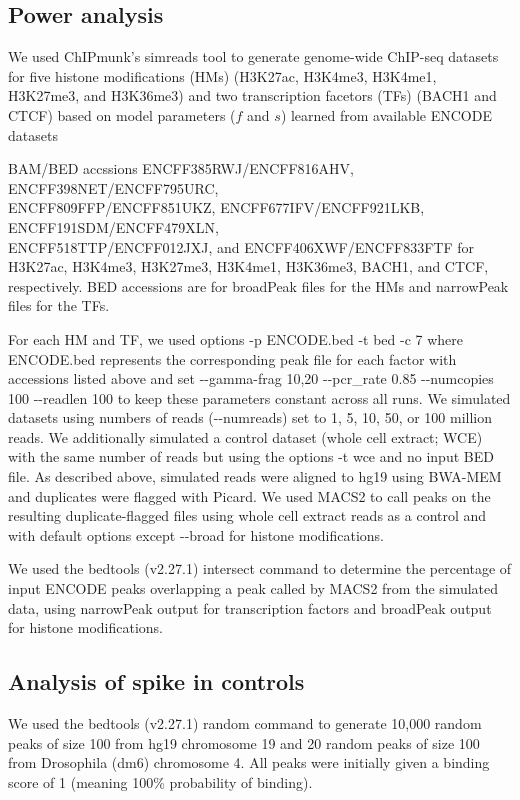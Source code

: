 \documentclass[12pt]{article}
\begin{document}
\subsection*{Power analysis}
We used ChIPmunk's simreads tool to generate genome-wide ChIP-seq datasets for five histone modifications (HMs) (H3K27ac, H3K4me3, H3K4me1, H3K27me3, and H3K36me3) and two transcription facetors (TFs) (BACH1 and CTCF) based on model parameters ($f$ and $s$) learned from available ENCODE datasets

BAM/BED accssions ENCFF385RWJ/ENCFF816AHV, ENCFF398NET/ENCFF795URC, \\ENCFF809FFP/ENCFF851UKZ, ENCFF677IFV/ENCFF921LKB, ENCFF191SDM/ENCFF479XLN,\\ ENCFF518TTP/ENCFF012JXJ, and ENCFF406XWF/ENCFF833FTF for
H3K27ac, H3K4me3, H3K27me3, H3K4me1, H3K36me3, BACH1, and CTCF, respectively. BED accessions are for broadPeak files for the HMs and narrowPeak files for the TFs.

For each HM and TF, we used options -p ENCODE.bed -t bed -c 7 where ENCODE.bed represents the corresponding peak file for each factor with accessions listed above and set -{}-gamma-frag 10,20 -{}-pcr\_rate 0.85 -{}-numcopies 100 -{}-readlen 100 to keep these parameters constant across all runs.
We simulated datasets using numbers of reads (-{}-numreads) set to 1, 5, 10, 50, or 100 million reads.
We additionally simulated a control dataset (whole cell extract; WCE) with the same number of reads but using the options -t wce and no input BED file. As described above, simulated reads were aligned to hg19 using BWA-MEM and duplicates were flagged with Picard.
We used MACS2 \cite{MACS2} to call peaks on the resulting duplicate-flagged files using whole cell extract reads as a control and with default options except -{}-broad for histone modifications.

We used the bedtools \cite{bedtools} (v2.27.1) intersect command to determine the percentage of input ENCODE peaks overlapping a peak called by MACS2 from the simulated data, using narrowPeak output for transcription factors and broadPeak output for histone modifications.

\subsection*{Analysis of spike in controls}
We used the bedtools \cite{bedtools} (v2.27.1) random command to generate 10,000 random peaks of size 100 from hg19 chromosome 19 and 20 random peaks of size 100 from Drosophila (dm6) chromosome 4. All peaks were initially given a binding score of 1 (meaning 100\% probability of binding).
\end{document}
